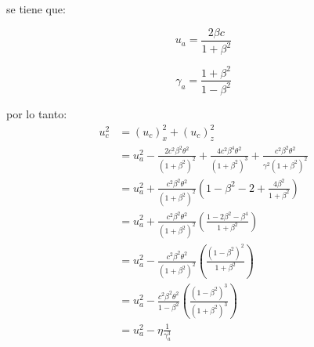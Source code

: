     se tiene que:\\
    \begin{minipage}{0.5\linewidth}
        \begin{equation*}
            u_a = \frac{2\beta c}{1+\beta^2}
        \end{equation*}
    \end{minipage}
    \begin{minipage}{0.5\linewidth}
        \begin{equation*}
            \gamma_a = \frac{1+\beta^2}{1-\beta^2}
        \end{equation*}
    \end{minipage}
    por lo tanto:
    \begin{align*}
        u_c^2&= (u_c)_x^2+(u_c)_z^2 \\
        & = u_a^2 - \frac{2c^2 \beta^2 \theta^2}{(1+\beta^2)^2} + \frac{4c^2 \beta^4 \theta^2}{(1+\beta^2)^3}+\frac{c^2 \beta^2 \theta^2}{\gamma^2 (1+\beta^2)^2} \\
        & =u_a^2 + \frac{c^2 \beta^2 \theta^2}{(1+\beta^2)^2}\left(1-\beta^2-2 + \frac{4\beta^2}{1+\beta^2} \right)\\
        & = u_a^2 + \frac{c^2 \beta^2 \theta^2 }{(1+\beta^2)^2 }\left(\frac{1-2\beta^2-\beta^4}{1+\beta^2} \right) \\
        &= u_a^2 - \frac{c^2 \beta^2 \theta^2 }{(1+\beta^2)^2 }\left(\frac{(1-\beta^2)^2}{1+\beta^2} \right) \\
        & = u_a^2 -\frac{c^2 \beta^2 \theta^2}{1-\beta^2} \left(\frac{(1-\beta^2)^3}{(1+\beta^2)^3}\right)\\
        & = u_a^2 - \eta \frac{1}{\gamma^3_a}
    \end{align*}